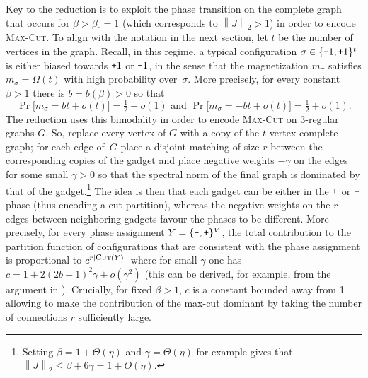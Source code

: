 \documentclass[11pt]{article}
\newcommand\norm[1]{\left\|{#1}\right\|}
\newcommand{\pl}{\textup{\texttt{+}}}
\newcommand{\mi}{\textup{\texttt{-}}}
\begin{document}
Key to the reduction is to exploit the phase transition on the complete graph that occurs for $\beta>\beta_c=1$ (which corresponds to $\norm{J}_2>1$) in order to encode \textsc{Max-Cut}. To align with the notation in the next section, let $t$ be the number of vertices in the graph. Recall, in this regime, a typical configuration $\sigma\in \{\mi 1,\pl 1\}^t$ is either biased towards $\pl 1$ or $\mi 1$, in the sense that the magnetization $m_\sigma$ satisfies $m_\sigma=\Omega(t)$ with high probability over~$\sigma$. More precisely, for every constant $\beta>1$ there is  $b=b(\beta)>0$ so that
\[\Pr\big[m_\sigma=bt +o(t)\big]=\tfrac{1}{2}+o(1)\mbox{ and }\Pr\big[m_\sigma=-bt +o(t)\big]=\tfrac{1}{2}+o(1).\]  
The reduction uses this bimodality in order to encode \textsc{Max-Cut} on 3-regular graphs $G$. So, replace every vertex of $G$ with a copy of the $t$-vertex complete graph; for each edge of~$G$ place a disjoint matching of  size $r$ between the corresponding copies of the gadget and place negative weights $-\gamma$ on the edges for some small $\gamma>0$ so that the spectral norm of the final graph is dominated by that of the gadget.\footnote{\label{fn:bc}
Setting $\beta=1+\Theta(\eta)$ and $\gamma=\Theta(\eta)$ for example gives that  $\norm{J}_2\leq \beta+6\gamma=1+O(\eta)$.} The idea is then that each gadget can  be either in the $\pl$ or $\mi$ phase (thus encoding a cut partition), whereas the negative weights on the $r$ edges between neighboring gadgets favour the phases to be different. More precisely,  for every phase assignment $Y=\{\mi,\pl\}^V$, the total contribution to the partition function of configurations that are consistent with the phase assignment is proportional to $c^{r|\mbox{\footnotesize\textsc{Cut}}(Y)|}$ where  for small $\gamma$ one has  $c=1+2(2b-1)^2\gamma +o(\gamma^2)$ (this can be derived, for example, from the argument in \cite[Appendix A.1]{Inapproxa}). Crucially, for fixed $\beta>1$, $c$ is a constant bounded away from 1 allowing to make the contribution of the max-cut dominant by taking the number of connections $r$ sufficiently large.
\end{document}
